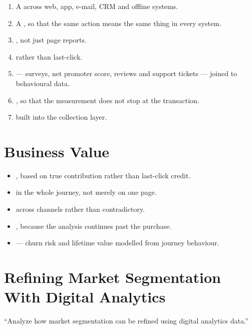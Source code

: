 \begin{enumerate}
\item A  across web, app, e-mail, CRM and offline
      systems.
\item A , so that the same action means the same
      thing in every system.
\item {}, not just page reports.
\item {} rather than last-click.
\item {} --- surveys, net promoter score, reviews and
      support tickets --- joined to behavioural data.
\item {}, so that the measurement does not stop
      at the transaction.
\item {} built into the collection layer.
\end{enumerate}

\section{Business Value}

\begin{itemize}
\item {}, based on true contribution rather than
      last-click credit.
\item {} in the whole journey,
      not merely on one page.
\item {} across channels rather than
      contradictory.
\item {}, because the analysis continues past the purchase.
\item {} --- churn risk and lifetime value modelled from
      journey behaviour.
\end{itemize}

\section{Refining Market Segmentation With Digital Analytics}

\begin{keybox}
``Analyze how market segmentation can be refined using digital analytics data.''
\end{keybox}

